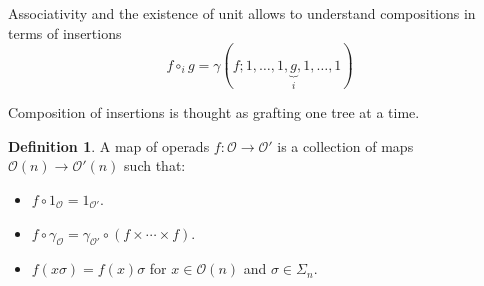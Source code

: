 \documentclass{beamer}
\theoremstyle{definition}
\newtheorem{defi}{Definition}
\begin{document}
\begin{frame}
	Associativity and the existence of unit allows to understand compositions in terms of insertions $$f\circ_i g=\gamma(f;1,\dots, 1,\underbrace{g}_{i},1,\dots, 1)$$ \pause
	
	Composition of insertions is thought as grafting one tree at a time.
\end{frame}
\begin{frame}
	\begin{defi}
	 A map of operads $f:\mathcal{O}\to \mathcal{O}'$ is a collection of maps $\mathcal{O}(n)\to \mathcal{O}'(n)$ such that:
		\begin{itemize}
			\item<1->   $f\circ 1_\mathcal{O}=1_{\mathcal{O}'}$.
			\item<2->  $f\circ \gamma_\mathcal{O}=\gamma_{\mathcal{O}'}\circ (f\times\cdots\times f)$.
			\item<3->   $f(x\sigma)=f(x)\sigma$ for $x\in\mathcal{O}(n)$ and $\sigma\in\Sigma_n$.
		\end{itemize}
	\end{defi}
	
	
\end{frame}
%	
\end{document}

